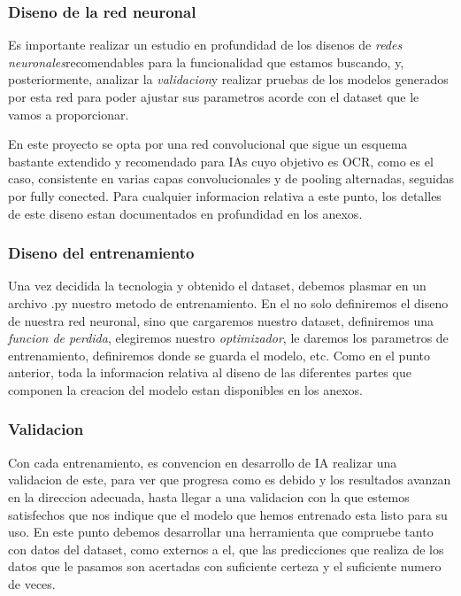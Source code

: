 \documentclass{article}
\begin{document}
\subsubsection{Diseno de la red neuronal}
Es importante realizar un estudio en profundidad de los disenos de \textit{redes neuronales}\rep recomendables para la funcionalidad que estamos buscando, y, posteriormente, analizar la \textit{validacion}\rep y realizar pruebas de los modelos generados por esta red para poder ajustar sus parametros acorde con el dataset que le vamos a proporcionar.

En este proyecto se opta por una red convolucional que sigue un esquema bastante extendido y recomendado para IAs cuyo objetivo es OCR, como es el caso, consistente en varias capas convolucionales y de pooling alternadas, seguidas por fully conected. Para cualquier informacion relativa a este punto, los detalles de este diseno estan documentados en profundidad en los anexos.

\subsubsection{Diseno del entrenamiento}
Una vez decidida la tecnologia y obtenido el dataset, debemos plasmar en un archivo .py nuestro metodo de entrenamiento. En el no solo definiremos el diseno de nuestra red neuronal, sino que cargaremos nuestro dataset, definiremos una \textit{funcion de perdida}\rep , elegiremos nuestro \textit{optimizador}\rep, le daremos los parametros de entrenamiento, definiremos donde se guarda el modelo, etc. Como en el punto anterior, toda la informacion relativa al diseno de las diferentes partes que componen la creacion del modelo estan disponibles en los anexos.

\subsubsection{Validacion}
Con cada entrenamiento, es convencion en desarrollo de IA realizar una validacion de este, para ver que progresa como es debido y los resultados avanzan en la direccion adecuada, hasta llegar a una validacion con la que estemos satisfechos que nos indique que el modelo que hemos entrenado esta listo para su uso. En este punto debemos desarrollar una herramienta que compruebe tanto con datos del dataset, como externos a el, que las predicciones que realiza de los datos que le pasamos son acertadas con suficiente certeza y el suficiente numero de veces.
\end{document}
